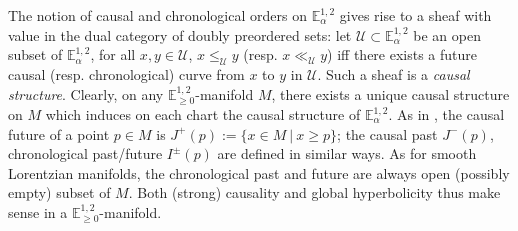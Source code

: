 \documentclass[a4paper,12pt]{article}
\def\U{\mathcal U}
\newcommand{\mass}[1]{{\mathbb E}^{1,2}_{#1}}
\begin{document}
The notion of causal and chronological orders on $\mass{\alpha}$ gives rise to a sheaf with value in the dual category of doubly preordered sets:  
let $\U\subset \mass{\alpha}$ be an open subset of $\mass{\alpha}$, for all $x,y\in \U$,  $x\leq_\U y$ (resp. $x \ll _\U y$) iff there exists a future causal (resp. chronological) curve from $x$ to $y$ in $\U$. Such a sheaf is a {\it causal structure}. 
Clearly, on any $\mass{\geq0}$-manifold $M$, there exists a unique causal structure on $M$ which induces on each chart the causal structure of $\mass{\alpha}$. 
As in \cite{oneil}, the causal future of a point $p\in M$ is $ J^+(p):= \{x\in M ~|~ x\geq p\}$; the causal past $J^-(p)$, chronological past/future $I^\pm(p)$ are defined in similar ways. As for  smooth Lorentzian manifolds, the chronological past and future are always open (possibly empty) subset of $M$.  
Both (strong) causality and global hyperbolicity thus make sense in a $\mass{\geq 0}$-manifold. 
\end{document}
